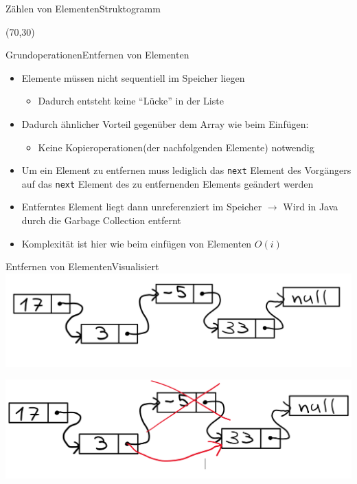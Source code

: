 \begin{frame}{Zählen von Elementen}{Struktogramm}
\begin{centernss}
	\begin{struktogramm}(70,30)
		\whileend
	\end{struktogramm}
\end{centernss}
\end{frame}

\begin{frame}{Grundoperationen}{Entfernen von Elementen}
	\begin{itemize}
		\item Elemente müssen nicht sequentiell im Speicher liegen
		\begin{itemize}
			\item Dadurch entsteht keine "`Lücke"' in der Liste
		\end{itemize}
		\item Dadurch ähnlicher Vorteil gegenüber dem Array wie beim Einfügen:
		\begin{itemize}
			\item Keine Kopieroperationen(der nachfolgenden Elemente) notwendig
		\end{itemize}
		\item Um ein Element zu entfernen muss lediglich das \texttt{next} Element des Vorgängers auf das \texttt{next} Element des
		zu entfernenden Elements geändert werden
		\item Entferntes Element liegt dann unreferenziert im Speicher $\rightarrow$ Wird in Java durch die Garbage Collection entfernt
		\item Komplexität ist hier wie beim einfügen von Elementen $O(i)$
	\end{itemize}
\end{frame}

\begin{frame}{Entfernen von Elementen}{Visualisiert}
\includegraphics[width=.8\textwidth]{graph/llist_remove_pre}

\includegraphics[width=.8\textwidth]{graph/llist_remove_post}
\end{frame}

